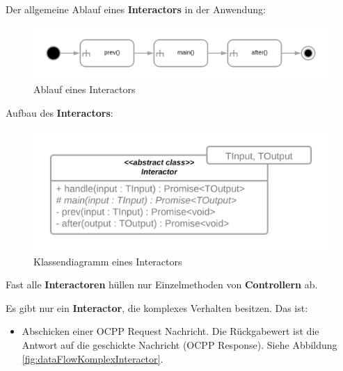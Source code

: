 Der allgemeine Ablauf eines \textbf{Interactors} in der Anwendung:
\begin{figure}[H]
    \centering
    \includegraphics[width=1\textwidth]{./images/InteractorAblauf.png}
    \caption[Ablauf eines Interactors]{Ablauf eines Interactors}
    \label{fig:InteractorFlow}
\end{figure}
Aufbau des \textbf{Interactors}:
\begin{figure}[H]
    \centering
    \includegraphics[width=1\textwidth]{./images/InteractorStructur.png}
    \caption[Klassendiagramm eines Interactors]{Klassendiagramm eines Interactors}
    \label{fig:InteractorStructur}
\end{figure}


Fast alle \textbf{Interactoren} hüllen nur Einzelmethoden von \textbf{Controllern} ab.


Es gibt nur ein \textbf{Interactor}, die komplexes Verhalten besitzen.
Das ist:
\begin{itemize}
    \item Abschicken einer OCPP Request Nachricht. Die Rückgabewert ist die Antwort auf die geschickte Nachricht (OCPP Response).
    Siehe Abbildung \ref{fig:dataFlowKomplexInteractor}.
\end{itemize}